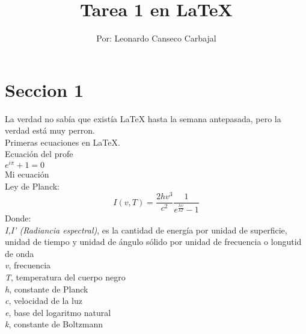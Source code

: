 \documentclass[10pt,a4paper]{article}
\title{Tarea 1 en LaTeX}
\author{Por: Leonardo Canseco Carbajal}
\begin{document}
\maketitle 
% 

\section{Seccion 1}

La verdad no sabía que existía LaTeX hasta la semana antepasada, pero la verdad está muy perron.\\

Primeras ecuaciones en \LaTeX.\\ %

Ecuación del profe\\
$ e^{i \pi} + 1 = 0 $ \\ %

Mi ecuación\\
Ley de Planck:\\
$$I(v,T)= \dfrac{2hv^3}{c^2} \dfrac{1}{e^{\frac{hv}{kT}} -1}$$
Donde:\\

\textit{I,I' (Radiancia espectral)}, es la cantidad de energía por unidad de superficie, unidad de tiempo y unidad de ángulo sólido por unidad de frecuencia o longutid de onda\\
\textit{v}, frecuencia\\
\textit{T}, temperatura del cuerpo negro\\
\textit{h}, constante de Planck\\
\textit{c}, velocidad de la luz\\
\textit{e}, base del logaritmo natural\\
\textit{k}, constante de Boltzmann\\
\end{document}
